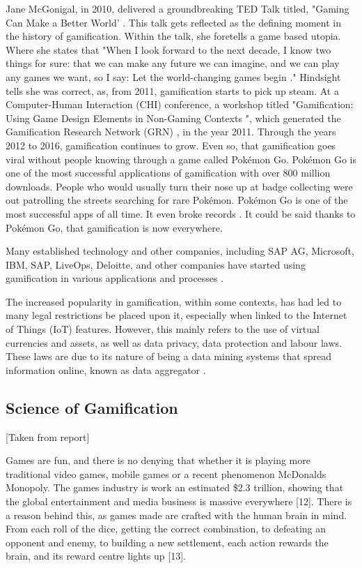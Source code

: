 \documentclass{sigchi}
\begin{document}
Jane McGonigal, in 2010, delivered a groundbreaking TED Talk titled, "Gaming Can Make a Better World' \cite{6}. This talk gets reflected as the defining moment in the history of gamification. Within the talk, she foretells a game based utopia. Where she states that "When I look forward to the next decade, I know two things for sure: that we can make any future we can imagine, and we can play any games we want, so I say: Let the world-changing games begin \cite{6}." Hindsight tells she was correct, as, from 2011, gamification starts to pick up steam.  At a Computer-Human Interaction (CHI) conference, a workshop titled "Gamification: Using Game Design Elements in Non-Gaming Contexts \cite{7}", which generated the Gamification Research Network (GRN) \cite{11}, in the year 2011. Through the years 2012 to 2016, gamification continues to grow. Even so, that gamification goes viral without people knowing through a game called Pokémon Go. Pokémon Go is one of the most successful applications of gamification with over 800 million downloads. People who would usually turn their nose up at badge collecting were out patrolling the streets searching for rare Pokémon. Pokémon Go is one of the most successful apps of all time. It even broke records \cite{3, 8}. It could be said thanks to Pokémon Go, that gamification is now everywhere. 

Many established technology and other companies, including SAP AG, Microsoft, IBM, SAP, LiveOps, Deloitte, and other companies have started using gamification in various applications and processes \cite{9}. 

The increased popularity in gamification, within some contexts, has had led to many legal restrictions be placed upon it, especially when linked to the Internet of Things (IoT) features. However, this mainly refers to the use of virtual currencies and assets, as well as data privacy, data protection and labour laws. These laws are due to its nature of being a data mining systems that spread information online, known as data aggregator \cite{10, 11}. 

\subsection{Science of Gamification}
[Taken from report]

Games are fun, and there is no denying that whether it is playing more traditional video games, mobile games or a recent phenomenon McDonalds Monopoly. The games industry is work an estimated \$2.3 trillion, showing that the global entertainment and media business is massive everywhere [12]. There is a reason behind this, as games made are crafted with the human brain in mind. From each roll of the dice, getting the correct combination, to defeating an opponent and enemy, to building a new settlement, each action rewards the brain, and its reward centre lights up [13]. 
\end{document}
